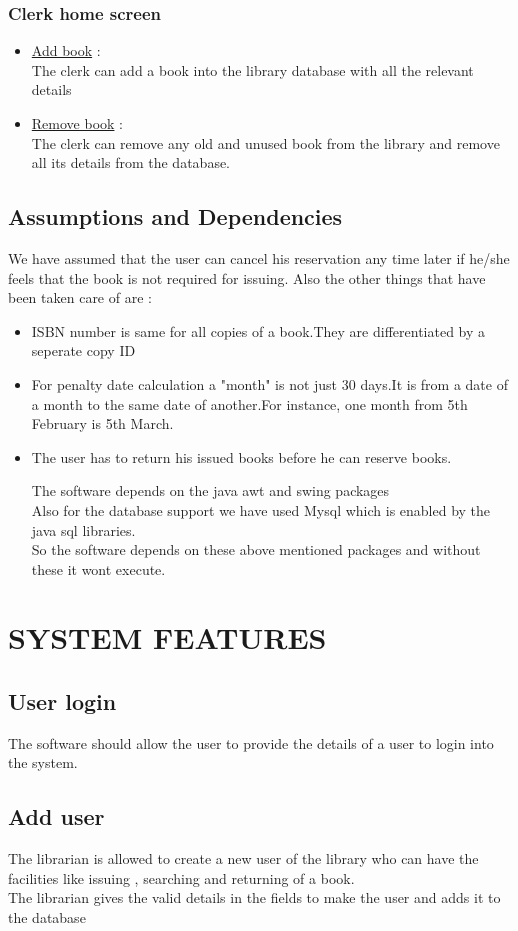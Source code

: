 \documentclass{article}
\begin{document}
\subsubsection*{Clerk home screen}
\begin{itemize}
\item \underline{Add book} :\\ The clerk can add a book into the library database with all the relevant details
\item \underline{Remove book} :\\ The clerk can remove any old and unused book from the library and remove all its details from the database.
\end{itemize}
\subsection{Assumptions and Dependencies}
We have assumed that the user can cancel his reservation any time later if he/she feels that the book is not required for issuing.
Also the other things that have been taken care of are :
\begin{itemize}
\item ISBN number is same for all copies of a book.They are differentiated by a seperate copy ID
\item For penalty date calculation a "month" is not just 30 days.It is from a date of a month to the same date of another.For instance, one month from 5th February is 5th March.
\item The user has to return his issued books before he can reserve books.

The software depends on the java awt and swing packages\\
Also for the database support we have used Mysql which is enabled by the java sql libraries.
\\So the software depends on these above mentioned packages and without these it wont execute.
\end{itemize}
\section{SYSTEM FEATURES}
\subsection{User login}
The software should allow the user to provide the details of a user to login into the system.
\subsection{Add user}
The librarian is allowed to create a new user of the library who can have the facilities like issuing , searching and returning of a book.
\\
The librarian gives the valid details in the fields to make the user and adds it to the database
\end{document}
